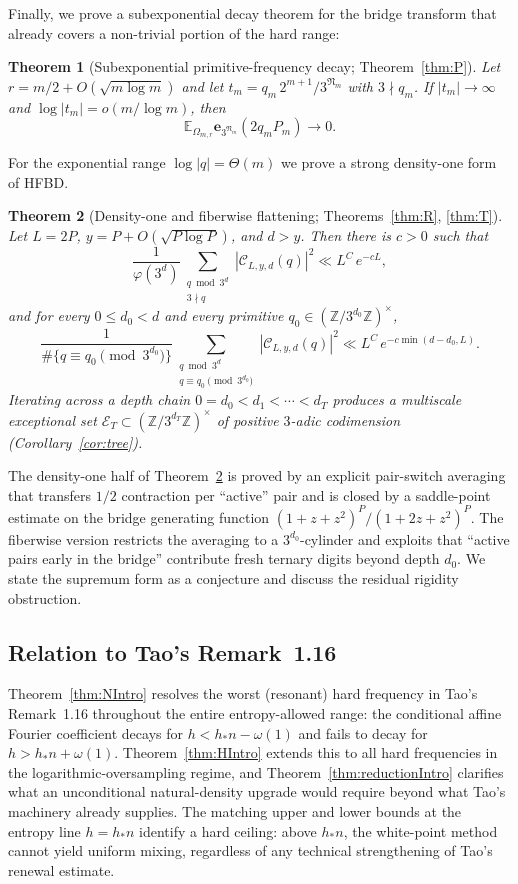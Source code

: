 \documentclass[11pt,a4paper]{amsart}
\theoremstyle{plain}
\newtheorem{theorem}{Theorem}[section]
\theoremstyle{definition}
\newcommand{\Z}{\mathbb{Z}}
\newcommand{\E}{\mathbb{E}}
\begin{document}
Finally, we prove a subexponential decay theorem for the bridge transform
that already covers a non-trivial portion of the hard range:

\begin{theorem}[Subexponential primitive-frequency decay;
Theorem~\ref{thm:P}]\label{thm:PIntro}
Let $r=m/2+O(\sqrt{m\log m})$ and let $t_m=q_m\,2^{m+1}/3^{\mathfrak N_m}$ with
$3\nmid q_m$.
If $|t_m|\to\infty$ and $\log|t_m|=o(m/\log m)$, then
$$
\E_{\Omega_{m,r}}\mathbf e_{3^{\mathfrak N_m}}(2q_mP_m)\to0.
$$
\end{theorem}

For the exponential range $\log|q|=\Theta(m)$ we prove a strong
density-one form of HFBD.

\begin{theorem}[Density-one and fiberwise flattening; Theorems~\ref{thm:R}, \ref{thm:T}]\label{thm:RTIntro}
Let $L=2P$, $y=P+O(\sqrt{P\log P})$, and $d>y$.
Then there is $c>0$ such that
$$
\frac{1}{\varphi(3^d)}\sum_{\substack{q\bmod 3^d\\3\nmid q}}|\mathcal C_{L,y,d}(q)|^2
\ll L^C\,e^{-cL},
$$
and for every $0\le d_0<d$ and every primitive
$q_0\in(\Z/3^{d_0}\Z)^\times$,
$$
\frac{1}{\#\{q\equiv q_0\!\!\pmod{3^{d_0}}\}}
\sum_{\substack{q\bmod 3^d\\q\equiv q_0\!\!\pmod{3^{d_0}}}}|\mathcal C_{L,y,d}(q)|^2
\ll L^C\,e^{-c\min(d-d_0,L)}.
$$
Iterating across a depth chain $0=d_0<d_1<\cdots<d_T$ produces a
multiscale exceptional set
$\mathcal E_T\subset(\Z/3^{d_T}\Z)^\times$ of positive $3$-adic
codimension (Corollary~\ref{cor:tree}).
\end{theorem}

The density-one half of Theorem~\ref{thm:RTIntro} is proved by an
explicit pair-switch averaging that transfers $1/2$ contraction per
``active'' pair and is closed by a saddle-point estimate on the bridge
generating function $(1+z+z^2)^P/(1+2z+z^2)^P$.
The fiberwise version restricts the averaging to a $3^{d_0}$-cylinder
and exploits that ``active pairs early in the bridge'' contribute fresh
ternary digits beyond depth $d_0$.
We state the supremum form as a conjecture and discuss the residual
rigidity obstruction.

\subsection{Relation to Tao's Remark~1.16}
Theorem~\ref{thm:NIntro} resolves the worst (resonant) hard frequency in
Tao's Remark~1.16 throughout the entire entropy-allowed range:
the conditional affine Fourier coefficient decays for $h<h_\ast n-\omega(1)$
and fails to decay for $h>h_\ast n+\omega(1)$.
Theorem~\ref{thm:HIntro} extends this to all hard frequencies in the
logarithmic-oversampling regime, and Theorem~\ref{thm:reductionIntro}
clarifies what an unconditional natural-density upgrade would require
beyond what Tao's machinery already supplies.
The matching upper and lower bounds at the entropy line $h=h_\ast n$
identify a hard ceiling: above $h_\ast n$, the white-point method cannot
yield uniform mixing, regardless of any technical strengthening of Tao's
renewal estimate.
\end{document}
